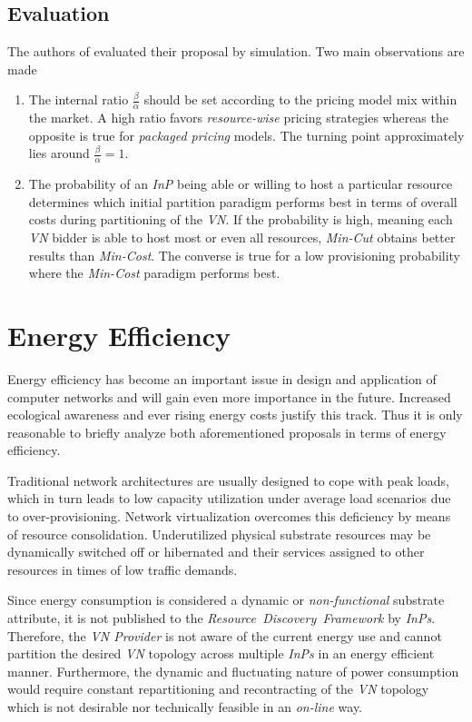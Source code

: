 \documentclass[prodmode,acmtomccap]{acmlarge}
\begin{document}
\subsection{Evaluation}
The authors of  evaluated their proposal by simulation. Two main observations are made

\begin{enumerate}
	\item The internal ratio $\frac{\beta}{\alpha}$ should be set according to the pricing model mix within the market. A high ratio favors \emph{resource-wise}
		pricing strategies whereas the opposite is true for \emph{packaged pricing} models. The turning point approximately lies around $\frac{\beta}{\alpha} = 1$.
	\item The probability of an \emph{InP} being able or willing to host a particular resource determines which initial partition paradigm performs best in terms of overall costs 
		during partitioning of the \emph{VN}. If the probability is high, meaning each \emph{VN} bidder is able to host most or even all resources, \emph{Min-Cut} obtains
		better results than \emph{Min-Cost}. The converse is true for a low provisioning probability where the \emph{Min-Cost} paradigm performs best.
\end{enumerate}

\section{Energy Efficiency}
\label{sec:efficiency}
Energy efficiency has become an important issue in design and application of computer networks and will gain even more importance in the future. 
Increased ecological awareness and ever rising energy costs justify this track.
Thus it is only reasonable to briefly analyze both aforementioned proposals in terms of energy efficiency.
 
Traditional network architectures are usually designed to cope with peak loads, which in turn leads to low capacity utilization under average load scenarios due to over-provisioning.
Network virtualization overcomes this deficiency by means of resource consolidation. Underutilized physical substrate resources may be dynamically switched off or hibernated and their services
assigned to other resources in times of low traffic demands.

Since energy consumption is considered a dynamic or \emph{non-functional} substrate attribute, it is not published to the \emph{Resource~Discovery~Framework}
by \emph{InPs}. Therefore, the \emph{VN Provider} is not aware of the current energy use and cannot partition the desired \emph{VN} topology across multiple
\emph{InPs} in an energy efficient manner. Furthermore, the dynamic and fluctuating nature of power consumption would require constant repartitioning and recontracting
of the \emph{VN} topology which is not desirable nor technically feasible in an \emph{on-line} way.
\end{document}
